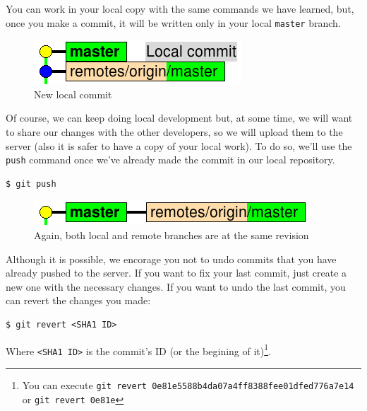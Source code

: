 \documentclass[a4paper,10pt]{article}
\newenvironment{terminal}
  {
    \vspace{+10pt}
    \begin{center}
    \begin{minipage}{0.95\textwidth}
    \begin{framed}
  }
  {
    \end{framed}
    \end{minipage}
    \end{center}
    \vspace{+10pt}
  }
\begin{document}
You can work in your local copy with the same commands we have
learned, but, once you make a commit, it will be written only in your
local \texttt{master} branch.

\begin{figure}[h]
  \begin{center}
    \includegraphics[scale=0.5]{server-01}
  \end{center}
  \caption{New local commit}
\end{figure}

Of course, we can keep doing local development but, at some time, we
will want to share our changes with the other developers, so we will
upload them to the server (also it is safer to have a copy of your
local work). To do so, we'll use the \texttt{push} command once we've
already made the commit in our local repository.

\begin{terminal}
\begin{verbatim}
$ git push
\end{verbatim}%
\end{terminal}

\begin{figure}[h]
  \begin{center}
    \includegraphics[scale=0.5]{server-00}
  \end{center}
  \caption{Again, both local and remote branches are at the same revision}
\end{figure}

Although it is possible, we encorage you not to undo commits that you
have already pushed to the server. If you want to fix your last
commit, just create a new one with the necessary changes. If you want
to undo the last commit, you can revert the changes you made:

\begin{terminal}
\begin{verbatim}
$ git revert <SHA1 ID>
\end{verbatim}%
\end{terminal}

Where \texttt{<SHA1 ID>} is the commit's ID (or the begining of
it)\footnote{You can execute \texttt{git revert
0e81e5588b4da07a4ff8388fee01dfed776a7e14} or \texttt{git revert 0e81e}}.
\end{document}
